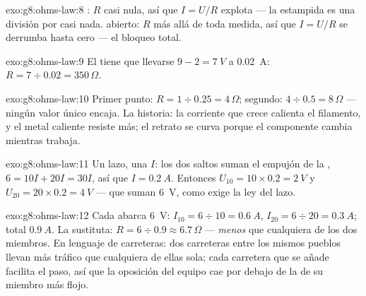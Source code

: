 \begin{solution}{exo:g8:ohms-law:8}
: $R$ casi nula, así que $I = U/R$ explota --- la
estampida es una división por casi nada.  abierto:
$R$ más allá de toda medida, así que $I = U/R$ se derrumba hasta
cero --- el bloqueo total.
\end{solution}

\begin{solution}{exo:g8:ohms-law:9}
El  tiene que llevarse $9 - 2 = \qty{7}{V}$ a
\qty{0.02}{A}: $R = 7 \div 0.02 = 350\,\Omega$.
\end{solution}

\begin{solution}{exo:g8:ohms-law:10}
Primer punto: $R = 1 \div 0.25 = 4\,\Omega$; segundo: $4 \div 0.5 =
8\,\Omega$ --- ningún valor único encaja. La historia: la corriente que
crece calienta el filamento, y el metal caliente resiste más;
el retrato se curva porque el componente cambia mientras trabaja.
\end{solution}

\begin{solution}{exo:g8:ohms-law:11}
Un lazo, una $I$: los dos saltos suman el empujón de la
, $6 = 10 I + 20 I = 30 I$, así que $I = \qty{0.2}{A}$.
Entonces $U_{10} = 10 \times 0.2 = \qty{2}{V}$ y $U_{20} = 20 \times
0.2 = \qty{4}{V}$ --- que suman \qty{6}{V}, como exige la ley del
lazo.
\end{solution}

\begin{solution}{exo:g8:ohms-law:12}
Cada  abarca \qty{6}{V}: $I_{10} = 6 \div 10 =
\qty{0.6}{A}$, $I_{20} = 6 \div 20 = \qty{0.3}{A}$; total
$\qty{0.9}{A}$. La sustituta: $R = 6 \div 0.9 \approx 6.7\,\Omega$ ---
\emph{menos} que cualquiera de los dos miembros. En lenguaje de
carreteras: dos carreteras entre los mismos pueblos llevan más tráfico
que cualquiera de ellas sola; cada carretera  que se añade
facilita el paso, así que la oposición del equipo cae por debajo de la
de su miembro más flojo.
\end{solution}

